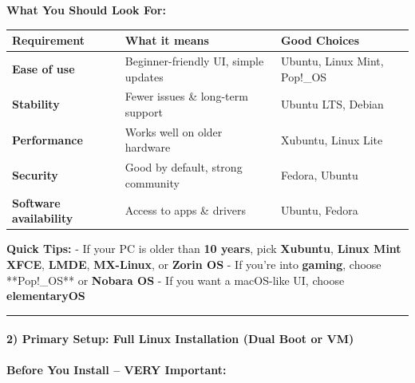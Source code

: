 \documentclass[
  english,
  paper=a4,
  oneside  ,captions=tableheading
]{scrartcl}
\newcounter{none} %
\begin{document}
\textbf{What You Should Look For:}

{\def\LTcaptype{none} %
\begin{longtable}[]{@{}
  >{\raggedright\arraybackslash}p{}
  >{\raggedright\arraybackslash}p{}
  >{\raggedright\arraybackslash}p{}@{}}
\toprule\noalign{}
\begin{minipage}[b]{\linewidth}\raggedright
Requirement
\end{minipage} & \begin{minipage}[b]{\linewidth}\raggedright
What it means
\end{minipage} & \begin{minipage}[b]{\linewidth}\raggedright
Good Choices
\end{minipage} \\
\midrule\noalign{}
\endhead
\bottomrule\noalign{}
\endlastfoot
\textbf{Ease of use} & Beginner-friendly UI, simple updates & Ubuntu,
Linux Mint, Pop!\_OS \\
\textbf{Stability} & Fewer issues \& long-term support & Ubuntu LTS,
Debian \\
\textbf{Performance} & Works well on older hardware & Xubuntu, Linux
Lite \\
\textbf{Security} & Good by default, strong community & Fedora,
Ubuntu \\
\textbf{Software availability} & Access to apps \& drivers & Ubuntu,
Fedora \\
\end{longtable}
}

\textbf{Quick Tips:} - If your PC is older than \textbf{10 years}, pick
\textbf{Xubuntu}, \textbf{Linux Mint XFCE}, \textbf{LMDE},
\textbf{MX-Linux}, or \textbf{Zorin OS} - If you're into
\textbf{gaming}, choose **Pop!\_OS** or \textbf{Nobara OS} - If you want
a macOS-like UI, choose \textbf{elementaryOS}

\begin{center}\rule{0.5\linewidth}{0.5pt}\end{center}

\paragraph{2) Primary Setup: Full Linux Installation (Dual Boot or
VM)}\label{primary-setup-full-linux-installation-dual-boot-or-vm}

\textbf{Before You Install -- VERY Important:}
\end{document}
